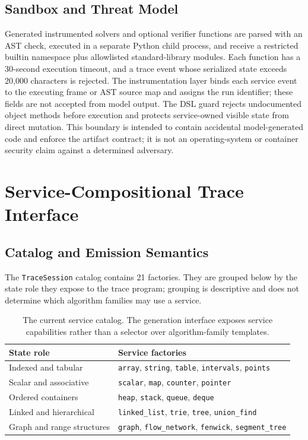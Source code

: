\documentclass[letterpaper]{article}
\begin{document}
\subsection{Sandbox and Threat Model}

Generated instrumented solvers and optional verifier functions are parsed with an AST check, executed in a separate Python child process, and receive a restricted builtin namespace plus allowlisted standard-library modules. Each function has a 30-second execution timeout, and a trace event whose serialized state exceeds 20,000 characters is rejected. The instrumentation layer binds each service event to the executing frame or AST source map and assigns the run identifier; these fields are not accepted from model output. The DSL guard rejects undocumented object methods before execution and protects service-owned visible state from direct mutation. This boundary is intended to contain accidental model-generated code and enforce the artifact contract; it is not an operating-system or container security claim against a determined adversary.

\section{Service-Compositional Trace Interface}

\subsection{Catalog and Emission Semantics}

The \texttt{TraceSession} catalog contains 21 factories. They are grouped below by the state role they expose to the trace program; grouping is descriptive and does not determine which algorithm families may use a service.

\begin{table}[t]
\centering
\small
\setlength{\tabcolsep}{4pt}
\begin{tabular}{@{}p{}p{}@{}}
\toprule
State role & Service factories \\
\midrule
Indexed and tabular & \texttt{array}, \texttt{string}, \texttt{table}, \texttt{intervals}, \texttt{points} \\
Scalar and associative & \texttt{scalar}, \texttt{map}, \texttt{counter}, \texttt{pointer} \\
Ordered containers & \texttt{heap}, \texttt{stack}, \texttt{queue}, \texttt{deque} \\
Linked and hierarchical & \texttt{linked\_list}, \texttt{trie}, \texttt{tree}, \texttt{union\_find} \\
Graph and range structures & \texttt{graph}, \texttt{flow\_network}, \texttt{fenwick}, \texttt{segment\_tree} \\
\bottomrule
\end{tabular}
\caption{The current service catalog. The generation interface exposes service capabilities rather than a selector over algorithm-family templates.}
\label{tab:service-catalog}
\end{table}
\end{document}
